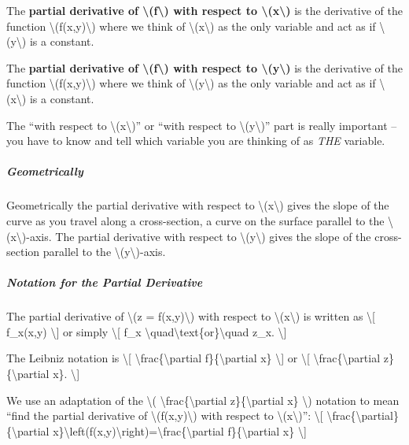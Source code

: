 The \textbf{partial derivative of \textbackslash{}(f\textbackslash{})
with respect to \textbackslash{}(x\textbackslash{})} is the derivative
of the function \textbackslash{}(f(x,y)\textbackslash{}) where we think
of \textbackslash{}(x\textbackslash{}) as the only variable and act as
if \textbackslash{}(y\textbackslash{}) is a constant.

The \textbf{partial derivative of \textbackslash{}(f\textbackslash{})
with respect to \textbackslash{}(y\textbackslash{})} is the derivative
of the function \textbackslash{}(f(x,y)\textbackslash{}) where we think
of \textbackslash{}(y\textbackslash{}) as the only variable and act as
if \textbackslash{}(x\textbackslash{}) is a constant.

The ``with respect to \textbackslash{}(x\textbackslash{})'' or ``with
respect to \textbackslash{}(y\textbackslash{})'' part is really
important -- you have to know and tell which variable you are thinking
of as \emph{THE} variable.

\hypertarget{geometrically}{%
\subparagraph{Geometrically}\label{geometrically}}

Geometrically the partial derivative with respect to
\textbackslash{}(x\textbackslash{}) gives the slope of the curve as you
travel along a cross-section, a curve on the surface parallel to the
\textbackslash{}(x\textbackslash{})-axis. The partial derivative with
respect to \textbackslash{}(y\textbackslash{}) gives the slope of the
cross-section parallel to the \textbackslash{}(y\textbackslash{})-axis.

\hypertarget{notation-for-the-partial-derivative}{%
\subparagraph{Notation for the Partial
Derivative}\label{notation-for-the-partial-derivative}}

The partial derivative of \textbackslash{}(z = f(x,y)\textbackslash{})
with respect to \textbackslash{}(x\textbackslash{}) is written as
\textbackslash{}{[} f\_x(x,y) \textbackslash{}{]} or simply
\textbackslash{}{[} f\_x
\textbackslash{}quad\textbackslash{}text\{or\}\textbackslash{}quad z\_x.
\textbackslash{}{]}

The Leibniz notation is \textbackslash{}{[}
\textbackslash{}frac\{\textbackslash{}partial
f\}\{\textbackslash{}partial x\} \textbackslash{}{]} or
\textbackslash{}{[} \textbackslash{}frac\{\textbackslash{}partial
z\}\{\textbackslash{}partial x\}. \textbackslash{}{]}

We use an adaptation of the \textbackslash{}(
\textbackslash{}frac\{\textbackslash{}partial
z\}\{\textbackslash{}partial x\} \textbackslash{}) notation to mean
``find the partial derivative of
\textbackslash{}(f(x,y)\textbackslash{}) with respect to
\textbackslash{}(x\textbackslash{})'': \textbackslash{}{[}
\textbackslash{}frac\{\textbackslash{}partial\}\{\textbackslash{}partial
x\}\textbackslash{}left(f(x,y)\textbackslash{}right)=\textbackslash{}frac\{\textbackslash{}partial
f\}\{\textbackslash{}partial x\} \textbackslash{}{]}

